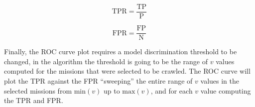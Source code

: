\begin{equation} \label{eq:tpr}
    \text{TPR} = \dfrac{\text{TP}}{\text{P}}
\end{equation}

\begin{equation} \label{eq:fpr}
    \text{FPR} = \dfrac{\text{FP}}{\text{N}}
\end{equation}

Finally, the ROC curve plot requires a model discrimination threshold to be changed, in the \mlblink algorithm the threshold is going to be the range of $v$ values computed for the missions that were selected to be crawled. The ROC curve will plot the TPR against the FPR ``sweeping'' the entire range of $v$ values in the selected missions from $\text{min}(v)$ up to $\text{max}(v)$, and for each $v$ value computing the TPR and FPR.

